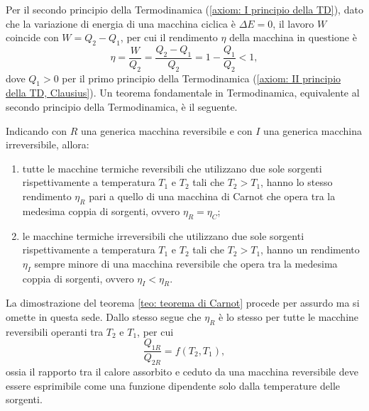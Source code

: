 Per il secondo principio della Termodinamica (\ref{axiom: I principio della TD}), dato che la variazione di energia di una macchina ciclica è $\Delta E = 0$, il lavoro $W$ coincide con $W = Q_2 - Q_1$, per cui il rendimento $\eta$ della macchina in questione è
\begin{equation}
\label{eq: rendimento macchina ciclica reversibile}
    \eta = \frac{W}{Q_2} = \frac{Q_2 - Q_1}{Q_2} = 1 - \frac{Q_1}{Q_2} < 1,
\end{equation}
dove $Q_1 > 0$ per il primo principio della Termodinamica (\ref{axiom: II principio della TD, Clausius}). Un teorema fondamentale in Termodinamica, equivalente al secondo principio della Termodinamica, è il seguente.
\begin{teo}[di Carnot]
\label{teo: teorema di Carnot}
    Indicando con $R$ una generica macchina reversibile e con $I$ una generica macchina irreversibile, allora:
    \begin{enumerate}
        \item tutte le macchine termiche reversibili che utilizzano due sole sorgenti rispettivamente a temperatura $T_1$ e $T_2$ tali che $T_2 > T_1$, hanno lo stesso rendimento $\eta_R$ pari a quello di una macchina di Carnot che opera tra la medesima coppia di sorgenti, ovvero $\eta_R = \eta_C$;
        \item le macchine termiche irreversibili che utilizzano due sole sorgenti rispettivamente a temperatura $T_1$ e $T_2$ tali che $T_2 > T_1$, hanno un rendimento $\eta_I$ sempre minore di una macchina reversibile che opera tra la medesima coppia di sorgenti, ovvero $\eta_I < \eta_R$.
    \end{enumerate}
\end{teo}
La dimostrazione del teorema \ref{teo: teorema di Carnot} procede per assurdo ma si omette in questa sede. Dallo stesso segue che $\eta_R$ è lo stesso per tutte le macchine reversibili operanti tra $T_2$ e $T_1$, per cui
\begin{equation}
\label{eq: rapporto calori macchina reversibile}
    \frac{Q_{1R}}{Q_{2R}}=f(T_2,T_1),
\end{equation}
ossia il rapporto tra il calore assorbito e ceduto da una macchina reversibile deve essere esprimibile come una funzione dipendente solo dalla temperature delle sorgenti.

